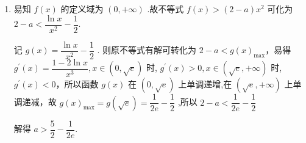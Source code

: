 \begin{enumerate}
\begin{jieda}
\begin{enumerate}
            当 $\dfrac{1}{2} < x < 1$ 时, ${f}^{\prime }\left( x\right)  > 0$ ,当 $1 < x < 4$ 时, ${f}^{\prime }\left( x\right)  < 0$
            
            所以函数 $f\left( x\right)$ 在 $\left( {\dfrac{1}{2},1}\right)$ 上单调递增,在$(1,4)$上单调递减，所以当 $x = 1$ 时, $f\left( x\right)$ 取得最大值. 最大值为 $f\left( 1\right)  =  - \dfrac{1}{2}$，又 $f\left( \dfrac{1}{2}\right)  = \ln \dfrac{1}{2} - \dfrac{1}{8} =  - \ln 2 - \dfrac{1}{8},f\left( 4\right)  = 2\ln 2 - 8$
            
            $f\left( \dfrac{1}{2}\right)  - f\left( 4\right)  =  - 3\ln 2 - \dfrac{1}{8} + 8 >  - 3 - \dfrac{1}{8} + 8 > 0.$
            
            所以 $f\left( \dfrac{1}{2}\right)  > f\left( 4\right)$ . 所以当 $x = 4$ 时, $f\left( x\right)$ 取得最小值. 最小值为 $f\left( 4\right)  = 2\ln 2 - 8$
            
            故 $f\left( x\right)$ 在 $\left\lbrack  {\dfrac{1}{2},4}\right\rbrack$ 上的最大值为 $- \dfrac{1}{2}$ . 最小值为 $2\ln 2 - 8$.
            
            \item 易知 $f\left( x\right)$ 的定义域为 $\left( {0, + \infty }\right)$ .故不等式 $f\left( x\right)  > \left( {2 - a}\right) {x}^{2}$ 可化为 $2 - a < \dfrac{\ln x}{{x}^{2}} - \dfrac{1}{2}$.
            
            记 $g\left( x\right)  = \dfrac{\ln x}{{x}^{2}} - \dfrac{1}{2}$ . 则原不等式有解可转化为 $2 - a < g{\left( x\right) }_{\max }$，易得 ${g}^{\prime }\left( x\right)  = \dfrac{1 - 2\ln x}{{x}^{3}},x \in  \left( {0,\sqrt{{e}}}\right)$ 时, ${g}^{\prime }\left( x\right)  > 0,x \in  \left( {\sqrt{{e}}, + \infty }\right)$ 时, ${g}^{\prime }\left( x\right)  < 0$，所以函数 $g\left( x\right)$ 在 $\left( {0,\sqrt{{e}}}\right)$ 上单调递增,在 $\left( {\sqrt{{e}}, + \infty }\right)$ 上单调递减，故 $g{\left( x\right) }_{\max } = g\left( \sqrt{{e}}\right)  = \dfrac{1}{2{e}} - \dfrac{1}{2}$ ,所以 $2 - a < \dfrac{1}{2{e}} - \dfrac{1}{2}$
            
            解得 $a > \dfrac{5}{2} - \dfrac{1}{2{e}}$.
        \end{enumerate}
    \end{jieda}


\end{enumerate}

